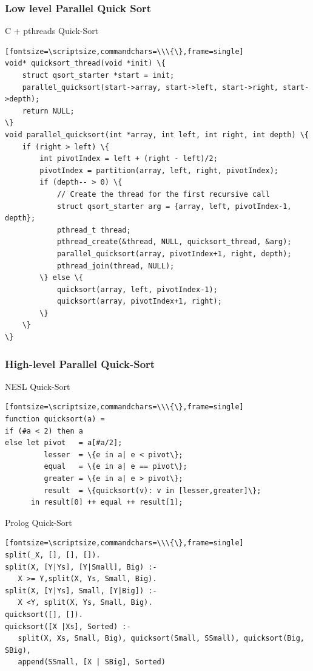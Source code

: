 \documentclass{beamer}
\begin{document}
\begin{frame}[fragile]
   \frametitle{Low level Parallel Quick Sort}
   \begin{block}{C + pthreads Quick-Sort}
      \begin{verbatim}[fontsize=\scriptsize,commandchars=\\\{\},frame=single]
void* quicksort_thread(void *init) \{
    struct qsort_starter *start = init;
    parallel_quicksort(start->array, start->left, start->right, start->depth);
    return NULL;
\}
void parallel_quicksort(int *array, int left, int right, int depth) \{
    if (right > left) \{
        int pivotIndex = left + (right - left)/2;
        pivotIndex = partition(array, left, right, pivotIndex);
        if (depth-- > 0) \{
            // Create the thread for the first recursive call
            struct qsort_starter arg = {array, left, pivotIndex-1, depth};
            pthread_t thread;
            pthread_create(&thread, NULL, quicksort_thread, &arg);
            parallel_quicksort(array, pivotIndex+1, right, depth);
            pthread_join(thread, NULL);
        \} else \{
            quicksort(array, left, pivotIndex-1);
            quicksort(array, pivotIndex+1, right);
        \}
    \}
\}
       \end{verbatim}
   \end{block}
\end{frame}

\begin{frame}[fragile]
   \frametitle{High-level Parallel Quick-Sort}
   \begin{block}{NESL Quick-Sort}
      \begin{verbatim}[fontsize=\scriptsize,commandchars=\\\{\},frame=single]
function quicksort(a) =
if (#a < 2) then a
else let pivot   = a[#a/2];
         lesser  = \{e in a| e < pivot\};
         equal   = \{e in a| e == pivot\};
         greater = \{e in a| e > pivot\};
         result  = \{quicksort(v): v in [lesser,greater]\};
      in result[0] ++ equal ++ result[1];
      \end{verbatim}
   \end{block}
   \begin{block}{Prolog Quick-Sort}
      \begin{verbatim}[fontsize=\scriptsize,commandchars=\\\{\},frame=single]
split(_X, [], [], []).
split(X, [Y|Ys], [Y|Small], Big) :-
   X >= Y,split(X, Ys, Small, Big).
split(X, [Y|Ys], Small, [Y|Big]) :-
   X <Y, split(X, Ys, Small, Big).
quicksort([], []).
quicksort([X |Xs], Sorted) :-
   split(X, Xs, Small, Big), quicksort(Small, SSmall), quicksort(Big, SBig),
   append(SSmall, [X | SBig], Sorted)
      \end{verbatim}
   \end{block}
\end{frame}
\end{document}
